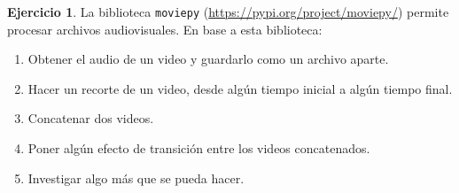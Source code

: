 \documentclass[a4paper,12pt]{book}
\theoremstyle{definition}
\newtheorem{ejercicio}{Ejercicio}
\begin{document}
	\begin{ejercicio}
		La biblioteca {\tt moviepy} (\href{https://pypi.org/project/moviepy/}{https://pypi.org/project/moviepy/}) permite procesar archivos audiovisuales. En base a esta biblioteca:
		\begin{enumerate}
			\item Obtener el audio de un video y guardarlo como un archivo aparte.
			\item Hacer un recorte de un video, desde algún tiempo inicial a algún tiempo final.
			\item Concatenar dos videos.
			\item Poner algún efecto de transición entre los videos concatenados.
			\item Investigar algo más que se pueda hacer.
		\end{enumerate}
	\end{ejercicio}
	
\end{document}
